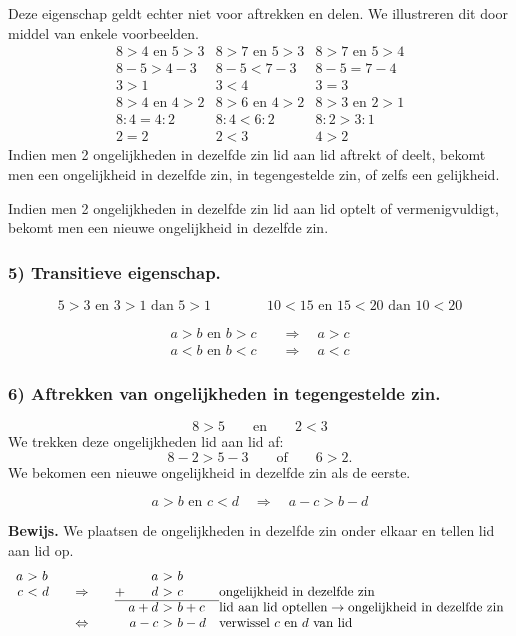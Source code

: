 \documentclass{bis}
\begin{document}
Deze eigenschap geldt echter niet voor aftrekken en delen. We illustreren dit door middel van
enkele voorbeelden.
\[
\begin{array}{ccc}
8>4\text{ en }5>3 & 8>7\text{ en }5>3 & 8>7\text{ en }5>4\\
8-5>4-3 & 8-5<7-3 & 8-5=7-4\\
3>1 & 3<4 & 3=3
\end{array}
\]
\[
\begin{array}{ccc}
8>4\text{ en }4>2 & 8>6\text{ en }4>2 & 8>3\text{ en }2>1\\
8:4=4:2 & 8:4<6:2 & 8:2>3:1\\
2=2 & 2<3 & 4>2
\end{array}
\]
Indien men 2 ongelijkheden in dezelfde zin lid aan lid aftrekt of deelt, bekomt men een
ongelijkheid in dezelfde zin, in tegengestelde zin, of zelfs een gelijkheid.
\begin{onthoud}
Indien men 2 ongelijkheden in dezelfde zin lid aan lid optelt of vermenigvuldigt, bekomt men een
nieuwe ongelijkheid in dezelfde zin.
\end{onthoud}

\subsubsection*{5) Transitieve eigenschap.}
\[5>3\text{ en }3>1\text{ dan }5>1\qquad\qquad10<15\text{ en }15<20\text{ dan }10<20\]
\begin{onthoud}
\begin{align*}
a>b\text{ en }b>c&\quad\Rightarrow\quad a>c\\
a<b\text{ en }b<c&\quad\Rightarrow\quad a<c
\end{align*}
\end{onthoud}

\subsubsection*{6) Aftrekken van ongelijkheden in tegengestelde zin.}
\[8>5\qquad\text{en}\qquad2<3\]
We trekken deze ongelijkheden lid aan lid af:
\[8-2>5-3\qquad\text{of}\qquad6>2.\]
We bekomen een nieuwe ongelijkheid in dezelfde zin als de eerste.
\begin{onthoud}
\[a>b\text{ en }c<d\quad\Rightarrow\quad a-c>b-d\]
\end{onthoud}
\textbf{Bewijs.} We plaatsen de ongelijkheden in dezelfde zin onder elkaar en tellen lid aan lid
op.
\[
\begin{array}{r@{\ }c@{\ }l@{\qquad}c@{\qquad}r@{\ }c@{\ }l@{\quad}l}
a&>&b & & a&>&b &\\
c&<&d &\Rightarrow& +\qquad d&>&c &\text{ongelijkheid in dezelfde zin}\\
\cline{5-7}
& & & & a+d&>&b+c &\text{lid aan lid optellen}\to\text{ongelijkheid in dezelfde zin}\\
& & &\Leftrightarrow&a-c&>&b-d &\text{verwissel $c$ en $d$ van lid}
\end{array}
\]
\end{document}
